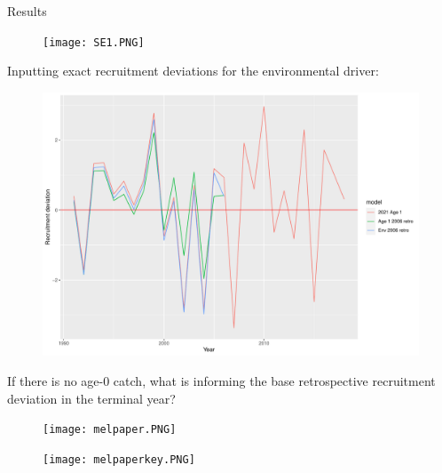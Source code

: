 \documentclass[
  ignorenonframetext,
]{beamer}
\begin{document}
\begin{frame}{Results}
\protect\hypertarget{results}{}
\end{frame}

\begin{frame}
\begin{figure}

{\centering \texttt{[image: SE1.PNG]}

}

\end{figure}
\end{frame}

\begin{frame}
Inputting exact recruitment deviations for the environmental driver:

\begin{figure}

{\centering \includegraphics{presentation_files/figure-beamer/unnamed-chunk-3-1.pdf}

}

\end{figure}
\end{frame}

\begin{frame}
If there is no age-0 catch, what is informing the base retrospective
recruitment deviation in the terminal year?

\begin{figure}

{\centering \texttt{[image: melpaper.PNG]}

}

\end{figure}

\begin{figure}

{\centering \texttt{[image: melpaperkey.PNG]}

}

\end{figure}
\end{frame}
\end{document}
